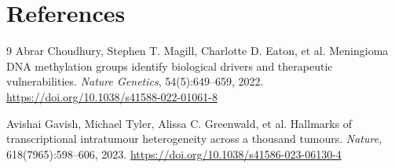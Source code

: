\documentclass[11pt]{article}
\begin{document}
\section*{References}
\begin{thebibliography}{9}
Abrar Choudhury, Stephen T. Magill, Charlotte D. Eaton, et al.
\newblock Meningioma DNA methylation groups identify biological drivers and therapeutic vulnerabilities.
\newblock \textit{Nature Genetics}, 54(5):649--659, 2022.
\newblock \url{https://doi.org/10.1038/s41588-022-01061-8}

Avishai Gavish, Michael Tyler, Alissa C. Greenwald, et al.
\newblock Hallmarks of transcriptional intratumour heterogeneity across a thousand tumours.
\newblock \textit{Nature}, 618(7965):598--606, 2023.
\newblock \url{https://doi.org/10.1038/s41586-023-06130-4}
\end{thebibliography}
\end{document}
